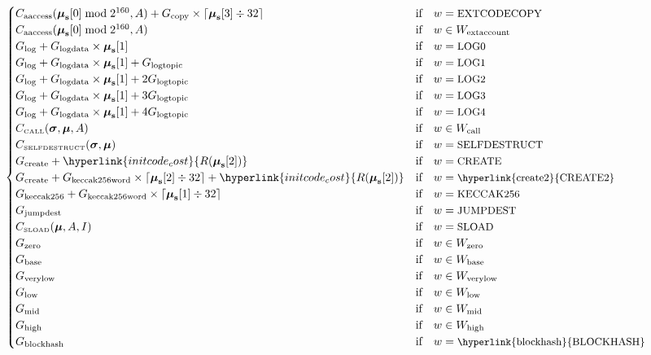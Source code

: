 \documentclass[9pt,oneside]{amsart}
\begin{document}
\begin{equation}
\begin{cases}
C_{\mathrm{aaccess}}(\boldsymbol{\mu}_{\mathbf{s}}[0] \bmod 2^{160}, A) + G_{\mathrm{copy}}\times\lceil\boldsymbol{\mu}_{\mathbf{s}}[3] \div 32\rceil & \text{if} \quad w = \text{\small EXTCODECOPY} \\
C_{\mathrm{aaccess}}(\boldsymbol{\mu}_{\mathbf{s}}[0] \bmod 2^{160}, A) & \text{if} \quad w \in W_{\mathrm{extaccount}}\\
G_{\mathrm{log}}+G_{\mathrm{logdata}}\times\boldsymbol{\mu}_{\mathbf{s}}[1] & \text{if} \quad w = \text{\small LOG0} \\
G_{\mathrm{log}}+G_{\mathrm{logdata}}\times\boldsymbol{\mu}_{\mathbf{s}}[1]+G_{\mathrm{logtopic}} & \text{if} \quad w = \text{\small LOG1} \\
G_{\mathrm{log}}+G_{\mathrm{logdata}}\times\boldsymbol{\mu}_{\mathbf{s}}[1]+2G_{\mathrm{logtopic}} & \text{if} \quad w = \text{\small LOG2} \\
G_{\mathrm{log}}+G_{\mathrm{logdata}}\times\boldsymbol{\mu}_{\mathbf{s}}[1]+3G_{\mathrm{logtopic}} & \text{if} \quad w = \text{\small LOG3} \\
G_{\mathrm{log}}+G_{\mathrm{logdata}}\times\boldsymbol{\mu}_{\mathbf{s}}[1]+4G_{\mathrm{logtopic}} & \text{if} \quad w = \text{\small LOG4} \\
C_\text{\tiny CALL}(\boldsymbol{\sigma}, \boldsymbol{\mu}, A) & \text{if} \quad w \in W_{\mathrm{call}} \\
C_\text{\tiny SELFDESTRUCT}(\boldsymbol{\sigma}, \boldsymbol{\mu}) & \text{if} \quad w = \text{\small SELFDESTRUCT} \\
G_{\mathrm{create}} + \hyperlink{initcode_cost}{R(\boldsymbol{\mu}_{\mathbf{s}}[2])} & \text{if} \quad w = \text{\small CREATE}\\
G_{\mathrm{create}}+G_{\mathrm{keccak256word}} \times \lceil \boldsymbol{\mu}_{\mathbf{s}}[2] \div 32 \rceil + \hyperlink{initcode_cost}{R(\boldsymbol{\mu}_{\mathbf{s}}[2])} & \text{if} \quad w = \text{\small \hyperlink{create2}{CREATE2}}\\
G_{\mathrm{keccak256}}+G_{\mathrm{keccak256word}} \times \lceil \boldsymbol{\mu}_{\mathbf{s}}[1] \div 32 \rceil & \text{if} \quad w = \text{\small KECCAK256}\\
G_{\mathrm{jumpdest}} & \text{if} \quad w = \text{\small JUMPDEST}\\
C_\text{\tiny SLOAD}(\boldsymbol{\mu}, A, I) & \text{if} \quad w = \text{\small SLOAD}\\
G_{\mathrm{zero}} & \text{if} \quad w \in W_{\mathrm{zero}}\\
G_{\mathrm{base}} & \text{if} \quad w \in W_{\mathrm{base}}\\
G_{\mathrm{verylow}} & \text{if} \quad w \in W_{\mathrm{verylow}}\\
G_{\mathrm{low}} & \text{if} \quad w \in W_{\mathrm{low}}\\
G_{\mathrm{mid}} & \text{if} \quad w \in W_{\mathrm{mid}}\\
G_{\mathrm{high}} & \text{if} \quad w \in W_{\mathrm{high}}\\
G_{\mathrm{blockhash}} & \text{if} \quad w = \text{\small \hyperlink{blockhash}{BLOCKHASH}}\\
\end{cases}
\end{equation}
\end{document}
